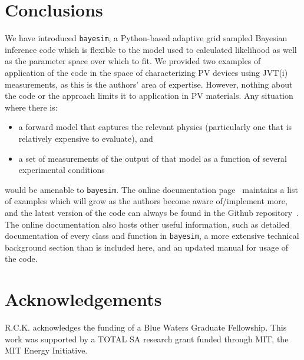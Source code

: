 \documentclass[aps,prl,amsmath,amssymb,superscriptaddress,notitlepage,groupedaddress]{revtex4-1}
\begin{document}
\section*{Conclusions}
 We have introduced \texttt{bayesim}, a Python-based adaptive grid sampled Bayesian inference code which is flexible to the model used to calculated likelihood as well as the parameter space over which to fit. We provided two examples of application of the code in the space of characterizing PV devices using JVT(i) measurements, as this is the authors' area of expertise. However, nothing about the code or the approach limits it to application in PV materials. Any situation where there is:
 \begin{itemize}
   \item a forward model that captures the relevant physics (particularly one that is relatively expensive to evaluate), and
   \item a set of measurements of the output of that model as a function of several experimental conditions
 \end{itemize}
 would be amenable to \texttt{bayesim}. The online documentation page~\cite{docs} maintains a list of examples which will grow as the authors become aware of/implement more, and the latest version of the code can always be found in the Github repository~\cite{gh}. The online documentation also hosts other useful information, such as detailed documentation of every class and function in \texttt{bayesim}, a more extensive technical background section than is included here, and an updated manual for usage of the code.

\section*{Acknowledgements}
R.C.K. acknowledges the funding of a Blue Waters Graduate Fellowship. This work was supported by a TOTAL SA research grant funded through MIT, the MIT Energy Initiative.



\end{document}
